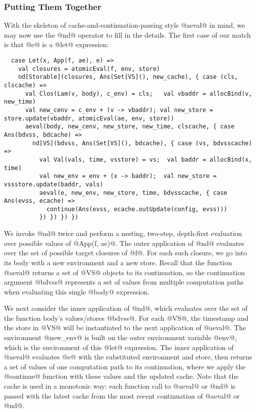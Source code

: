 \documentclass[acmsmall, screen]{acmart}\settopmatter{}
\begin{document}
\subsubsection{Putting Them Together}

With the skeleton of cache-and-continuation-passing style @aeval@ in mind, we may now
use the @nd@ operator to fill in the details. The first case of our
match is that @e@ is a @let@ expression:

\begin{lstlisting}
  case Let(x, App(f, ae), e) =>
    val closures = atomicEval(f, env, store)
    nd[Storable](closures, Ans(Set[VS](), new_cache), { case (cls, clscache) =>
      val Clos(Lam(v, body), c_env) = cls;   val vbaddr = allocBind(v, new_time)
      val new_cenv = c_env + (v -> vbaddr); val new_store = store.update(vbaddr, atomicEval(ae, env, store))
      aeval(body, new_cenv, new_store, new_time, clscache, { case Ans(bdvss, bdcache) =>
        nd[VS](bdvss, Ans(Set[VS](), bdcache), { case (vs, bdvsscache) =>
          val Val(vals, time, vsstore) = vs;  val baddr = allocBind(x, time)
          val new_env = env + (x -> baddr);  val new_store = vssstore.update(baddr, vals)
          aeval(e, new_env, new_store, time, bdvsscache, { case Ans(evss, ecache) =>
            continue(Ans(evss, ecache.outUpdate(config, evss)))
          }) }) }) })
\end{lstlisting}

We invoke @nd@ twice and perform a nesting, two-step, depth-first evaluation over
possible values of @App(f, ae)@.
The outer application of @nd@ evaluates over the set of possible target closures of
@f@. For each such closure, we go into its body with a new environment and a new store.
Recall that the function @aeval@ returns a set of @VS@ objects to its continuation,
so the continuation argument @bdvss@ represents a set of values from multiple computation
paths when evaluating this single @body@ expression.

We next consider the inner application of @nd@, which evaluates over the set of the function body's
values/stores @bdvss@. For each @VS@, the timestamp and the store in @VS@ will be
instantiated to the next application of @aeval@. The environment @new_env@ is built on
the outer environment variable @env@, which is the environment of this @let@ expression.
The inner application of @aeval@ evaluates @e@ with the substituted environment and store,
then returns a set of values of one computation path to its continuation, where we
apply the @continue@ function with these values and the updated cache.
Note that the cache is used in a monotonic way: each function call to @aeval@ or @nd@
is passed with the latest cache from the most recent continuation of @aeval@ or @nd@.
\end{document}
